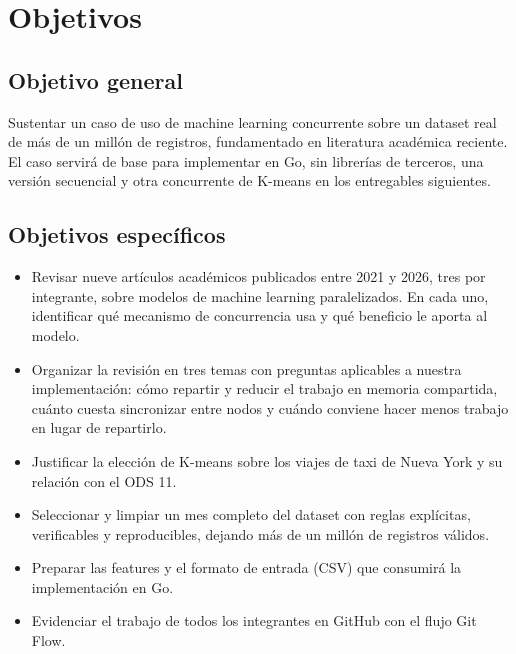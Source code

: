 \section{Objetivos}

\subsection{Objetivo general}

Sustentar un caso de uso de machine learning concurrente sobre un dataset real de más de un millón
de registros, fundamentado en literatura académica reciente. El caso servirá de base para
implementar en Go, sin librerías de terceros, una versión secuencial y otra concurrente de K-means
en los entregables siguientes.

\subsection{Objetivos específicos}

\begin{itemize}
  \item Revisar nueve artículos académicos publicados entre 2021 y 2026, tres por integrante, sobre
        modelos de machine learning paralelizados. En cada uno, identificar qué mecanismo de
        concurrencia usa y qué beneficio le aporta al modelo.
  \item Organizar la revisión en tres temas con preguntas aplicables a nuestra implementación: cómo
        repartir y reducir el trabajo en memoria compartida, cuánto cuesta sincronizar entre nodos y
        cuándo conviene hacer menos trabajo en lugar de repartirlo.
  \item Justificar la elección de K-means sobre los viajes de taxi de Nueva York y su relación con
        el ODS 11.
  \item Seleccionar y limpiar un mes completo del dataset con reglas explícitas, verificables y
        reproducibles, dejando más de un millón de registros válidos.
  \item Preparar las features y el formato de entrada (CSV) que consumirá la implementación en Go.
  \item Evidenciar el trabajo de todos los integrantes en GitHub con el flujo Git Flow.
\end{itemize}
